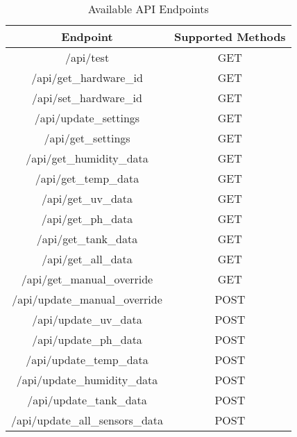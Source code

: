 \documentclass[12pt]{article} %
\begin{document}
\begin{table}[H]
    \centering
    \renewcommand{\arraystretch}{1.2} %
    \begin{tabular}{|c|c|}
        \hline
        \textbf{Endpoint} & \textbf{Supported Methods}\\
        \hline
        /api/test & GET \\
        \hline
        /api/get\_hardware\_id & GET \\
        \hline
        /api/set\_hardware\_id & GET \\
        \hline
        /api/update\_settings & GET \\
        \hline
        /api/get\_settings & GET \\
        \hline
        /api/get\_humidity\_data & GET \\
        \hline
        /api/get\_temp\_data & GET \\
        \hline
        /api/get\_uv\_data & GET \\
        \hline
        /api/get\_ph\_data & GET \\
        \hline
        /api/get\_tank\_data & GET \\
        \hline
        /api/get\_all\_data & GET \\
        \hline
        /api/get\_manual\_override & GET \\
        \hline
        /api/update\_manual\_override & POST \\
        \hline
        /api/update\_uv\_data & POST \\
        \hline
        /api/update\_ph\_data & POST \\
        \hline
        /api/update\_temp\_data & POST \\
        \hline
        /api/update\_humidity\_data & POST \\
        \hline
        /api/update\_tank\_data & POST \\
        \hline
        /api/update\_all\_sensors\_data & POST \\
        \hline
    \end{tabular}
    \caption{Available API Endpoints}
    \label{tab:API_Endpoints}
\end{table}
\end{document}
